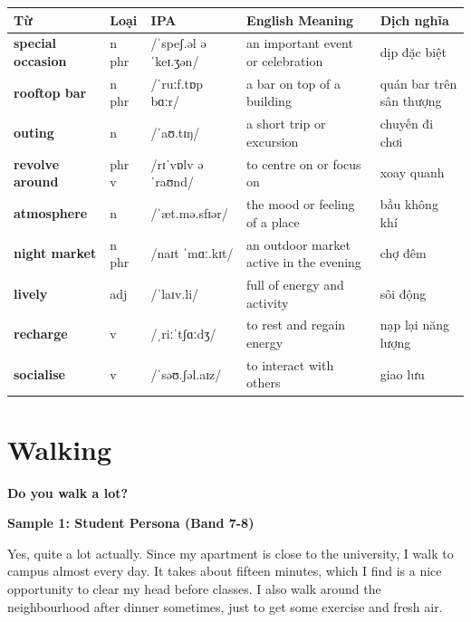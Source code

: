 \vspace{0.8em}
\begin{center}
\renewcommand{\arraystretch}{1.65}
\begin{tabularx}{\textwidth}{|V{0.22\textwidth}|C{0.07\textwidth}|I{0.20\textwidth}|Y|V{0.18\textwidth}|}
\hline
{}
\textbf{Từ} & \textbf{Loại} & \textbf{IPA} & \textbf{English Meaning} & \textbf{Dịch nghĩa} \\
\hline
\textbf{special occasion} & n phr & /ˈspeʃ.əl əˈkeɪ.ʒən/ & an important event or celebration & dịp đặc biệt \\ \hline
\textbf{rooftop bar} & n phr & /ˈruːf.tɒp bɑːr/ & a bar on top of a building & quán bar trên sân thượng \\ \hline
\textbf{outing} & n & /ˈaʊ.tɪŋ/ & a short trip or excursion & chuyến đi chơi \\ \hline
\textbf{revolve around} & phr v & /rɪˈvɒlv əˈraʊnd/ & to centre on or focus on & xoay quanh \\ \hline
\textbf{atmosphere} & n & /ˈæt.mə.sfɪər/ & the mood or feeling of a place & bầu không khí \\ \hline
\textbf{night market} & n phr & /naɪt ˈmɑː.kɪt/ & an outdoor market active in the evening & chợ đêm \\ \hline
\textbf{lively} & adj & /ˈlaɪv.li/ & full of energy and activity & sôi động \\ \hline
\textbf{recharge} & v & /ˌriːˈtʃɑːdʒ/ & to rest and regain energy & nạp lại năng lượng \\ \hline
\textbf{socialise} & v & /ˈsəʊ.ʃəl.aɪz/ & to interact with others & giao lưu \\ \hline
\end{tabularx}
\end{center}

\newpage

\section{Walking}
\begin{ieltsquestion}
\textbf{Do you walk a lot?}
\end{ieltsquestion}
\textbf{Sample 1: Student Persona (Band 7-8)}

Yes, quite a lot actually. Since my apartment is close to the university, I walk to campus almost every day. It takes about fifteen minutes, which I find is a nice opportunity to clear my head before classes. I also walk around the neighbourhood after dinner sometimes, just to get some exercise and fresh air.


